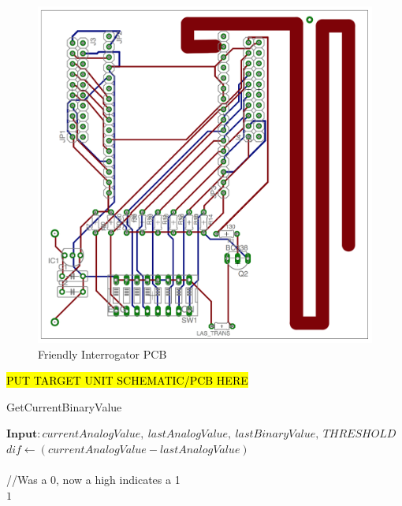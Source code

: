 \documentclass[letterpaper,10pt]{article}
\begin{document}
\begin{spacing}{1.15}
\begin{figure} [H]
	\centering
	\includegraphics[scale=0.37]{interrogator_pcb.png}
	\caption{Friendly Interrogator PCB\label{fig:interrogator-pcb}}
\end{figure}


\hl{PUT TARGET UNIT SCHEMATIC/PCB HERE}


\makeatletter
\def\BState{\State\hskip-\ALG@thistlm}
\makeatother

\begin{algorithm}[H]
	\caption{GetCurrentBinaryValue}\label{algo-1}
	\begin{algorithmic}[1]
		\State $\textbf{Input}: \textit{currentAnalogValue},\ \textit{lastAnalogValue},\ \textit{lastBinaryValue},\ \textit{THRESHOLD}$\\
		
		\State $\textit{dif} \gets (\textit{currentAnalogValue} - \textit{lastAnalogValue})$\\\\
		
		
		//Was a 0, now a high indicates a 1
		 \\
		\quad \Return $1$\\\\
		

\end{algorithmic}
\end{algorithm}
\end{spacing}
\end{document}
